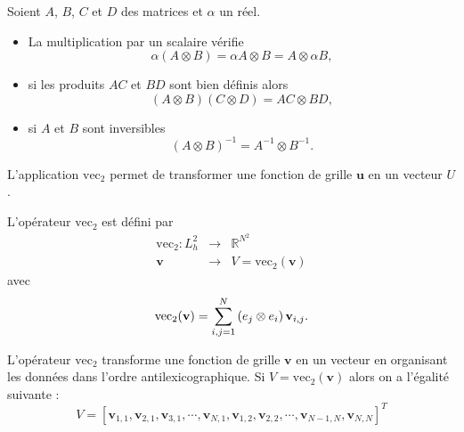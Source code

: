 \begin{proposition}
Soient $A$, $B$, $C$ et $D$ des matrices et $\alpha$ un réel.
\begin{itemize}
\item La multiplication par un scalaire vérifie
\begin{equation}
\alpha ( A \otimes B ) = \alpha A \otimes B = A \otimes \alpha B,
\end{equation}

\item si les produits $AC$ et $BD$ sont bien définis alors
\begin{equation}
(A \otimes B ) (C \otimes D) = AC \otimes BD,
\end{equation} 


\item si $A$ et $B$ sont inversibles
\begin{equation}
(A \otimes B)^{-1} = A^{-1} \otimes B^{-1}.
\end{equation}
\end{itemize}
\label{prop:pdt_kron}
\end{proposition}
L'application $\text{vec}_2$ permet de transformer une fonction de grille $\mathbf{u}$ en un vecteur $U$.

\begin{definition}
L'opérateur $\text{vec}_2$ est défini par
\begin{equation}
\begin{array}{rcl}
\text{vec}_2 : L^2_h & \longrightarrow & \mathbb{R}^{N^2}\\
\mathbf{v} & \longrightarrow & V = \text{vec}_2(\mathbf{v})
\end{array}
\end{equation}
avec
\begin{equation}
\text{vec}_2(\mathbf{v}) = \displaystyle\sum\limits_{i,j=1}^N \left( e_j \otimes e_i \right)\mathbf{v}_{i,j}.
\end{equation}
\end{definition}

L'opérateur $\text{vec}_2$ transforme une fonction de grille $\mathbf{v}$ en un vecteur en organisant les données dans l'ordre antilexicographique. Si $V = \text{vec}_2 (\mathbf{v})$ alors on a l'égalité suivante :
\begin{equation}
V=[\mathbf{v}_{1,1}, \mathbf{v}_{2,1}, \mathbf{v}_{3,1}, \cdots, \mathbf{v}_{N,1}, \mathbf{v}_{1,2}, \mathbf{v}_{2,2}, \cdots,  \mathbf{v}_{N-1,N}, \mathbf{v}_{N,N}]^T
\end{equation}

